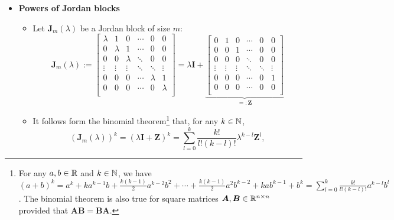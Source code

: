 \documentclass[12pt,a4paper]{article}
\begin{document}
\begin{itemize}
\item \textbf{Powers of Jordan blocks}
  \begin{itemize}
  \item Let $\bm{J}_{m}(\lambda)$ be a Jordan block of size $m$:
    \begin{equation}\nonumber%
      \bm{J}_{m}(\lambda) :=
      \begin{bmatrix}
        \lambda & 1 & 0 & \cdots & 0 & 0 \\
        0 & \lambda & 1 & \cdots & 0 & 0 \\
        0 & 0 & \lambda & \ddots & 0 & 0 \\
        \vdots & \vdots & \vdots & \ddots & \ddots & \vdots \\
        0 & 0 & 0 & \cdots & \lambda & 1 \\
        0 & 0 & 0  & \cdots & 0 &  \lambda \\
      \end{bmatrix}
      =
      \lambda \bm{I}
      +
      \underbrace{
      \begin{bmatrix}
        0 & 1 & 0 & \cdots & 0 & 0 \\
        0 & 0 & 1 & \cdots & 0 & 0 \\
        0 & 0 & 0 & \ddots & 0 & 0 \\
        \vdots & \vdots & \vdots & \ddots & \ddots & \vdots \\
        0 & 0 & 0 & \cdots & 0 & 1 \\
        0 & 0 & 0  & \cdots & 0 & 0 \\
      \end{bmatrix}}_{=:\bm{Z}}
    \end{equation}
  \item It follows form the binomial theorem\footnote{
      For any $a, b \in \mathbb{R}$ and $k\in \mathbb{N}$, we have
      $(a+b)^{k}=
      a^{k} + ka^{k-1}b + \frac{k(k-1)}{2}a^{k-2}b^{2}
      + \cdots
      + \frac{k(k-1)}{2}a^{2}b^{k-2} + kab^{k-1} + b^{k}
      =
      \sum_{l=0}^{k}\frac{k!}{l!(k-l)!}a^{k-l}b^{l}$.
      The binomial theorem is also true for square matrices $\bm{A}, \bm{B} \in \mathbb{R}^{n\times n}$
      provided that $\bm{A}\bm{B} = \bm{B}\bm{A}$.
    } that, for any $k\in \mathbb{N}$,
    \begin{equation}\nonumber%
      \textstyle (\bm{J}_{m}(\lambda))^{k}
      = (\lambda\bm{I} + \bm{Z})^{k}
      = \sum_{l=0}^{k}\frac{k!}{l!(k-l)!}\lambda^{k-l}\bm{Z}^{l},
    \end{equation}

\end{itemize}
\end{itemize}
\end{document}
